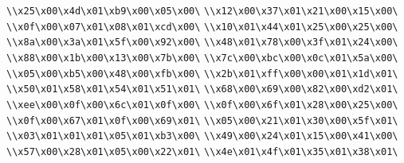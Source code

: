 \verb|\\x25\x00\x4d\x01\xb9\x00\x05\x00\|\newline
\verb|\\x12\x00\x37\x01\x21\x00\x15\x00\|\newline
\verb|\\x0f\x00\x07\x01\x08\x01\xcd\x00\|\newline
\verb|\\x10\x01\x44\x01\x25\x00\x25\x00\|\newline
\verb|\\x8a\x00\x3a\x01\x5f\x00\x92\x00\|\newline
\verb|\\x48\x01\x78\x00\x3f\x01\x24\x00\|\newline
\verb|\\x88\x00\x1b\x00\x13\x00\x7b\x00\|\newline
\verb|\\x7c\x00\xbc\x00\x0c\x01\x5a\x00\|\newline
\verb|\\x05\x00\xb5\x00\x48\x00\xfb\x00\|\newline
\verb|\\x2b\x01\xff\x00\x00\x01\x1d\x01\|\newline
\verb|\\x50\x01\x58\x01\x54\x01\x51\x01\|\newline
\verb|\\x68\x00\x69\x00\x82\x00\xd2\x01\|\newline
\verb|\\xee\x00\x0f\x00\x6c\x01\x0f\x00\|\newline
\verb|\\x0f\x00\x6f\x01\x28\x00\x25\x00\|\newline
\verb|\\x0f\x00\x67\x01\x0f\x00\x69\x01\|\newline
\verb|\\x05\x00\x21\x01\x30\x00\x5f\x01\|\newline
\verb|\\x03\x01\x01\x01\x05\x01\xb3\x00\|\newline
\verb|\\x49\x00\x24\x01\x15\x00\x41\x00\|\newline
\verb|\\x57\x00\x28\x01\x05\x00\x22\x01\|\newline
\verb|\\x4e\x01\x4f\x01\x35\x01\x38\x01\|\newline
